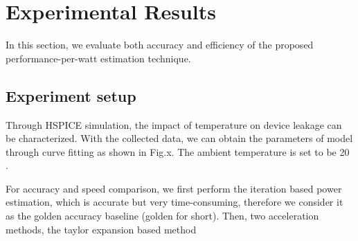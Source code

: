 \section{Experimental Results}
In this section, we evaluate both accuracy and efficiency of the proposed performance-per-watt estimation technique.

\subsection{Experiment setup}
Through HSPICE simulation, the impact of temperature on device leakage can be characterized. With the collected data, we can obtain the parameters of model through curve fitting as shown in Fig.x. The ambient temperature is set to be 20 \degreeCelsius.

For accuracy and speed comparison, we first perform the iteration based power estimation, which is accurate but very time-consuming, therefore we consider it as the golden accuracy baseline (golden for short). Then, two acceleration methods, the taylor expansion based method 
